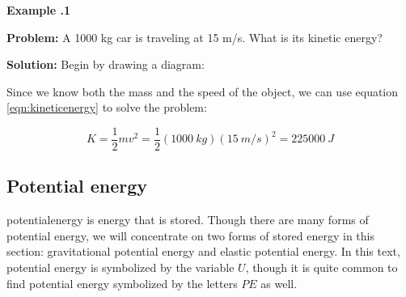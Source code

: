 	\begin{mdframed}[backgroundcolor=blue!10!white]
		\begin{center}
			
			
			\textbf{Example \thesection.1}	
		\end{center}
		
		\textbf{Problem: } A 1000 kg car is traveling at 15 m/s.  What is its kinetic energy?
		\vspace{0.1in}
		
		\textbf{Solution:} 
		Begin by drawing a diagram:
		\vspace{0.1in}
		\begin{center}
			

		\end{center}
	
	Since we know both the mass and the speed of the object, we can use equation \eqref{eqn:kineticenergy} to solve the problem:
	
		\begin{equation*}
		K = \frac{1}{2}mv^2 = \frac{1}{2}(\SI{1000}{kg})(\SI{15}{m/s})^2 = \SI{225000}{J}
	\end{equation*}

	
			
	
		
	\end{mdframed}
	
	\subsection{Potential energy}  
	\gls{potentialenergy} is energy that is stored.  Though there are many forms of potential energy, we will concentrate on two forms of stored energy in this section: gravitational potential energy and elastic potential energy.  In this text, potential energy is symbolized by the variable $U$, though it is quite common to find potential energy symbolized by the letters $PE$ as well. 
	
